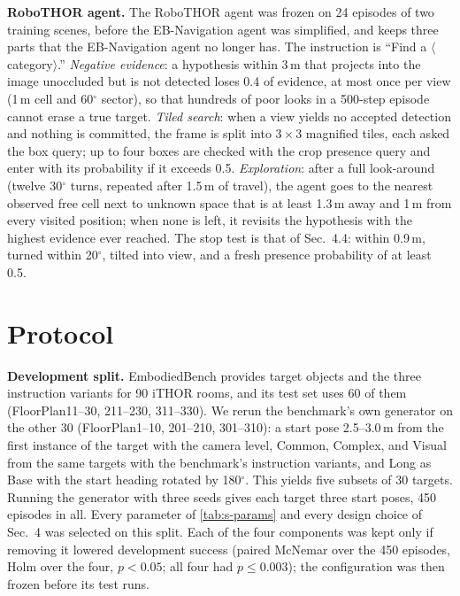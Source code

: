 \documentclass[10pt,twocolumn,letterpaper]{article}
\begin{document}
\noindent\textbf{RoboTHOR agent.}
The RoboTHOR agent was frozen on 24 episodes of two training scenes, before the EB-Navigation agent was simplified,
and keeps three parts that the EB-Navigation agent no longer has. The instruction is ``Find a $\langle$category$\rangle$.''
\emph{Negative evidence}: a hypothesis within 3\,m that projects into the image unoccluded but is not detected loses
0.4 of evidence, at most once per view (1\,m cell and 60$^\circ$ sector), so that hundreds of poor looks in a 500-step
episode cannot erase a true target. \emph{Tiled search}: when a view yields no accepted detection and nothing is
committed, the frame is split into $3{\times}3$ magnified tiles, each asked the box query; up to four boxes are checked
with the crop presence query and enter with its probability if it exceeds 0.5. \emph{Exploration}: after a full
look-around (twelve 30$^\circ$ turns, repeated after 1.5\,m of travel), the agent goes to the nearest observed free
cell next to unknown space that is at least 1.3\,m away and 1\,m from every visited position; when none is left, it
revisits the hypothesis with the highest evidence ever reached. The stop test is that of Sec.~4.4: within 0.9\,m,
turned within 20$^\circ$, tilted into view, and a fresh presence probability of at least 0.5.

\section{Protocol}
\label{sec:s-protocol}

\noindent\textbf{Development split.}
EmbodiedBench provides target objects and the three instruction variants for 90 iTHOR rooms, and its test set uses
60 of them (FloorPlan11--30, 211--230, 311--330). We rerun the benchmark's own generator on the other 30
(FloorPlan1--10, 201--210, 301--310): a start pose 2.5--3.0\,m from the first instance of the target with the camera
level, Common, Complex, and Visual from the same targets with the benchmark's instruction variants, and Long as Base
with the start heading rotated by 180$^\circ$. This yields five subsets of 30 targets. Running the generator with
three seeds gives each target three start poses, 450 episodes in all. Every parameter of \cref{tab:s-params} and
every design choice of Sec.~4 was selected on this split. Each of the four components was kept only if removing it
lowered development success (paired McNemar over the 450 episodes, Holm over the four, $p<0.05$; all four had $p\le0.003$); the configuration
was then frozen before its test runs.
\end{document}
